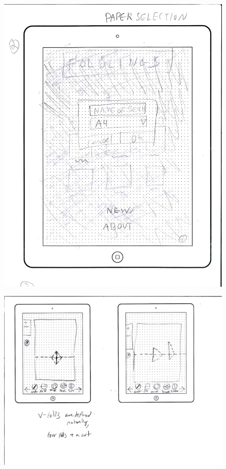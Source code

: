 \begin{figure}[htbp]
\centering
\includegraphics{figures/90_Appendix_UI_Mockups/004.png}
\caption{}
\end{figure}

\begin{figure}[htbp]
\centering
\includegraphics{figures/90_Appendix_UI_Mockups/005.png}
\caption{}
\end{figure}

